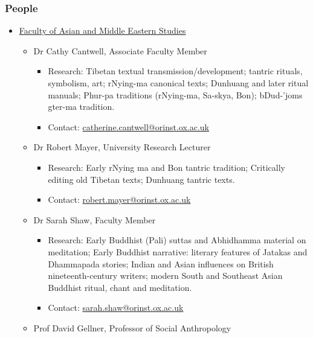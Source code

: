 \documentclass[11pt]{article}
\begin{document}
\subsubsection*{People}
\label{sec:org29530ad}
\begin{itemize}
\item \href{https://orinst.web.ox.ac.uk/}{Faculty of Asian and Middle Eastern Studies}
\label{sec:orgbcfbf77}
\begin{itemize}
\item Dr Cathy Cantwell, Associate Faculty Member
\label{sec:org081be8a}
\begin{itemize}
\item Research: Tibetan textual transmission/development; tantric rituals, symbolism, art; rNying-ma canonical texts; Dunhuang and later ritual manuals; Phur-pa traditions (rNying-ma, Sa-skya, Bon); bDud-’joms gter-ma tradition.\\
\item Contact: \href{mailto:catherine.cantwell@orinst.ox.ac.uk}{catherine.cantwell@orinst.ox.ac.uk}\\
\end{itemize}
\item Dr Robert Mayer, University Research Lecturer
\label{sec:org8fde900}
\begin{itemize}
\item Research: Early rNying ma and Bon tantric tradition; Critically editing old Tibetan texts; Dunhuang tantric texts.\\
\item Contact: \href{mailto:robert.mayer@orinst.ox.ac.uk}{robert.mayer@orinst.ox.ac.uk}\\
\end{itemize}
\item Dr Sarah Shaw, Faculty Member
\label{sec:org7063a2e}
\begin{itemize}
\item Research: Early Buddhist (Pali) suttas and Abhidhamma material on meditation; Early Buddhist narrative: literary features of Jatakas and Dhammapada stories; Indian and Asian influences on British nineteenth-century writers; modern South and Southeast Asian Buddhist ritual, chant and meditation.\\
\item Contact: \href{mailto:sarah.shaw@orinst.ox.ac.uk}{sarah.shaw@orinst.ox.ac.uk}\\
\end{itemize}
\item Prof David Gellner, Professor of Social Anthropology

\end{itemize}
\end{itemize}
\end{document}
